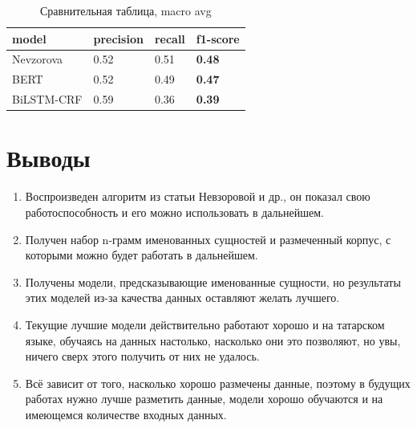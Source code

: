 \begin{table}[h!]

\begin{tabular}{| l | l | l | l |}
\hline

model &precision  &  recall & \textbf{f1-score} \\
\hline
Nevzorova & 0.52 & 0.51& \textbf{0.48} \\ 
\hline
BERT &  0.52 & 0.49 & \textbf{0.47} \\ 
\hline
BiLSTM-CRF &  0.59 & 0.36 & \textbf{0.39} \\
\hline
\end{tabular}

\caption{Сравнительная таблица,  macro avg}
\label{table:average}

\end{table}







\newpage

\section{Выводы}

\begin{enumerate}
\item Воспроизведен алгоритм из статьи Невзоровой и др., он показал свою работоспособность и его можно использовать в дальнейшем. %
\item Получен набор n-грамм именованных сущностей и размеченный корпус, с которыми можно будет работать в дальнейшем.
\item Получены модели, предсказывающие именованные сущности, но результаты этих моделей из-за качества данных оставляют желать лучшего.
\item Текущие лучшие модели действительно работают хорошо и на татарском языке, обучаясь на данных настолько, насколько они это позволяют, но увы, ничего сверх этого получить от них не удалось. 
\item Всё зависит от того, насколько хорошо размечены данные, поэтому в будущих работах нужно лучше разметить данные, модели хорошо обучаются и на имеющемся количестве входных данных.
\end{enumerate}























